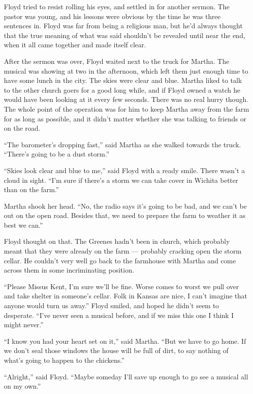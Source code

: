 Floyd tried to resist rolling his eyes, and settled in for another
sermon. The pastor was young, and his lessons were obvious by the time
he was three sentences in. Floyd was far from being a religious man, but
he'd always thought that the true meaning of what was said shouldn't be
revealed until near the end, when it all came together and made itself
clear.

After the sermon was over, Floyd waited next to the truck for Martha.
The musical was showing at two in the afternoon, which left them just
enough time to have some lunch in the city. The skies were clear and
blue. Martha liked to talk to the other church goers for a good long
while, and if Floyd owned a watch he would have been looking at it every
few seconds. There was no real hurry though. The whole point of the
operation was for him to keep Martha away from the farm for as long as
possible, and it didn't matter whether she was talking to friends or on
the road.

``The barometer's dropping fast,'' said Martha as she walked towards the
truck. ``There's going to be a dust storm.''

``Skies look clear and blue to me,'' said Floyd with a ready smile.
There wasn't a cloud in sight. ``I'm sure if there's a storm we can take
cover in Wichita better than on the farm.''

Martha shook her head. ``No, the radio says it's going to be bad, and we
can't be out on the open road. Besides that, we need to prepare the farm
to weather it as best we can.''

Floyd thought on that. The Greenes hadn't been in church, which probably
meant that they were already on the farm --- probably cracking open the
storm cellar. He couldn't very well go back to the farmhouse with Martha
and come across them in some incriminating position.

``Please Missus Kent, I'm sure we'll be fine. Worse comes to worst we
pull over and take shelter in someone's cellar. Folk in Kansas are nice,
I can't imagine that anyone would turn us away.'' Floyd smiled, and
hoped he didn't seem to desperate. ``I've never seen a musical before,
and if we miss this one I think I might never.''

``I know you had your heart set on it,'' said Martha. ``But we have to
go home. If we don't seal those windows the house will be full of dirt,
to say nothing of what's going to happen to the chickens.''

``Alright,'' said Floyd. ``Maybe someday I'll save up enough to go see a
musical all on my own.''

